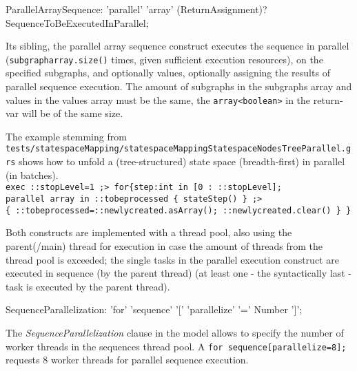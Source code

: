 \begin{rail}
  ParallelArraySequence: 'parallel' 'array' (ReturnAssignment)? SequenceToBeExecutedInParallel;
\end{rail}

Its sibling, the parallel array sequence construct executes the sequence in parallel (\texttt{subgraph\-array.size()} times, given sufficient execution resources), on the specified subgraphs, and optionally values, optionally assigning the results of parallel sequence execution.
The amount of subgraphs in the subgraphs array and values in the values array must be the same, the \verb#array<boolean># in the return-var will be of the same size.

\begin{example}
The example stemming from \texttt{tests/statespace\-Mapping/statespace\-Mapping\-Statespace\-Nodes\-Tree\-Parallel.grs} shows how to unfold a (tree-structured) state space (breadth-first) in parallel (in batches).\\
\verb#exec ::stopLevel=1 ;> for{step:int in [0 : ::stopLevel];#\\
\verb#parallel array in ::tobeprocessed { stateStep() } ;>#\\
\verb#{ ::tobeprocessed=::newlycreated.asArray(); ::newlycreated.clear() } }#
\end{example}\label{driverstatespace}


Both constructs are implemented with a thread pool, also using the parent(/main) thread for execution
in case the amount of threads from the thread pool is exceeded;
the single tasks in the parallel execution construct are executed in sequence
(by the parent thread) (at least one - the syntactically last - task is executed by the parent thread).

\begin{rail}
  SequenceParallelization: 'for' 'sequence' '[' 'parallelize' '=' Number ']';
\end{rail}

The \emph{SequenceParallelization} clause in the model allows to specify the number of worker threads in the sequences thread pool.
A \verb#for sequence[parallelize=8];# requests 8 worker threads for parallel sequence execution.


